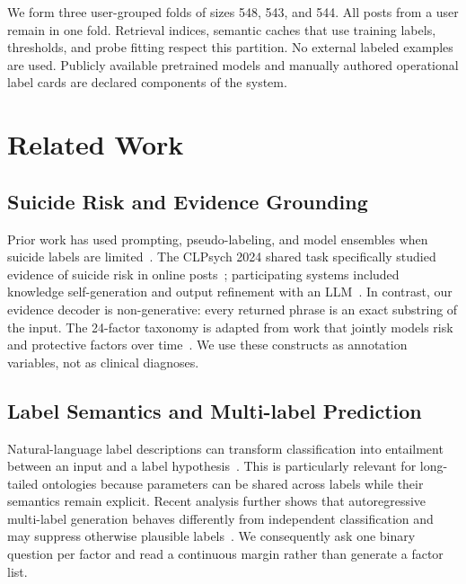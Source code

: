 \documentclass[conference]{IEEEtran}
\begin{document}
We form three user-grouped folds of sizes 548, 543, and 544. All posts from a user remain in one fold. Retrieval indices, semantic caches that use training labels, thresholds, and probe fitting respect this partition. No external labeled examples are used. Publicly available pretrained models and manually authored operational label cards are declared components of the system.

\section{Related Work}
\subsection{Suicide Risk and Evidence Grounding}
Prior work has used prompting, pseudo-labeling, and model ensembles when suicide labels are limited~\cite{nguyen2024limited}. The CLPsych 2024 shared task specifically studied evidence of suicide risk in online posts~\cite{chim2024overview}; participating systems included knowledge self-generation and output refinement with an LLM~\cite{tran2024ism}. In contrast, our evidence decoder is non-generative: every returned phrase is an exact substring of the input. The 24-factor taxonomy is adapted from work that jointly models risk and protective factors over time~\cite{li2025protective}. We use these constructs as annotation variables, not as clinical diagnoses.

\subsection{Label Semantics and Multi-label Prediction}
Natural-language label descriptions can transform classification into entailment between an input and a label hypothesis~\cite{talavera2023labelaware}. This is particularly relevant for long-tailed ontologies because parameters can be shared across labels while their semantics remain explicit. Recent analysis further shows that autoregressive multi-label generation behaves differently from independent classification and may suppress otherwise plausible labels~\cite{ma2025multilabel}. We consequently ask one binary question per factor and read a continuous margin rather than generate a factor list.
\end{document}
